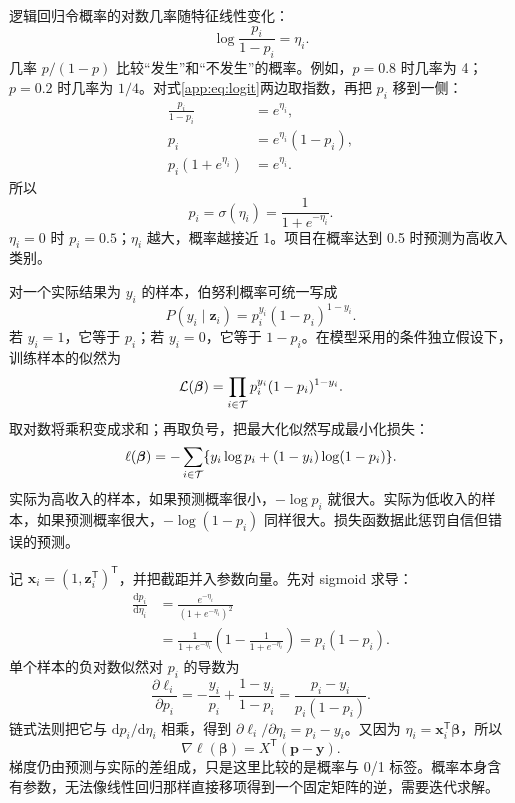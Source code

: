 逻辑回归令概率的对数几率随特征线性变化：
\begin{equation}\label{app:eq:logit}
\log\frac{p_i}{1-p_i}=\eta_i.
\end{equation}
几率 $p/(1-p)$ 比较“发生”和“不发生”的概率。例如，$p=0.8$ 时几率为 4；$p=0.2$ 时几率为 $1/4$。对式\eqref{app:eq:logit}两边取指数，再把 $p_i$ 移到一侧：
\begin{align*}
\frac{p_i}{1-p_i}&=e^{\eta_i},\\
p_i&=e^{\eta_i}(1-p_i),\\
p_i(1+e^{\eta_i})&=e^{\eta_i}.
\end{align*}
所以
\begin{equation}\label{app:eq:sigmoid}
p_i=\sigma(\eta_i)=\frac{1}{1+e^{-\eta_i}}.
\end{equation}
$\eta_i=0$ 时 $p_i=0.5$；$\eta_i$ 越大，概率越接近 1。项目在概率达到 0.5 时预测为高收入类别。

对一个实际结果为 $y_i$ 的样本，伯努利概率可统一写成
\begin{equation}
P(y_i\mid\mathbf z_i)=p_i^{y_i}(1-p_i)^{1-y_i}.
\end{equation}
若 $y_i=1$，它等于 $p_i$；若 $y_i=0$，它等于 $1-p_i$。在模型采用的条件独立假设下，训练样本的似然为
\[
\mathcal L(\boldsymbol\beta)=\prod_{i\in\mathcal{T}}p_i^{y_i}(1-p_i)^{1-y_i}.
\]
取对数将乘积变成求和；再取负号，把最大化似然写成最小化损失：
\begin{equation}\label{app:eq:crossentropy}
\ell(\boldsymbol\beta)
=-\sum_{i\in\mathcal{T}}\{y_i\log p_i+(1-y_i)\log(1-p_i)\}.
\end{equation}
实际为高收入的样本，如果预测概率很小，$-\log p_i$ 就很大。实际为低收入的样本，如果预测概率很大，$-\log(1-p_i)$ 同样很大。损失函数据此惩罚自信但错误的预测。

记 $\mathbf x_i=(1,\mathbf z_i^{\mathsf T})^{\mathsf T}$，并把截距并入参数向量。先对 sigmoid 求导：
\begin{align*}
\frac{\mathrm dp_i}{\mathrm d\eta_i}
&=\frac{e^{-\eta_i}}{(1+e^{-\eta_i})^2}\\
&=\frac1{1+e^{-\eta_i}}\left(1-\frac1{1+e^{-\eta_i}}\right)
=p_i(1-p_i).
\end{align*}
单个样本的负对数似然对 $p_i$ 的导数为
\[
\frac{\partial\ell_i}{\partial p_i}
=-\frac{y_i}{p_i}+\frac{1-y_i}{1-p_i}
=\frac{p_i-y_i}{p_i(1-p_i)}.
\]
链式法则把它与 $\mathrm dp_i/\mathrm d\eta_i$ 相乘，得到 $\partial\ell_i/\partial\eta_i=p_i-y_i$。又因为 $\eta_i=\mathbf x_i^{\mathsf T}\boldsymbol\beta$，所以
\begin{equation}
\nabla\ell(\boldsymbol\beta)=X^{\mathsf T}(\mathbf p-\mathbf y).
\end{equation}
梯度仍由预测与实际的差组成，只是这里比较的是概率与 0/1 标签。概率本身含有参数，无法像线性回归那样直接移项得到一个固定矩阵的逆，需要迭代求解。

